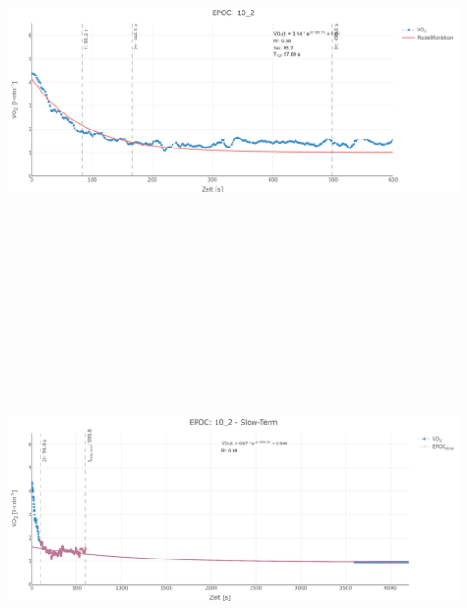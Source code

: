 \documentclass[
  letterpaper,
  DIV=11]{scrartcl}
\begin{document}
\includegraphics[width=11.45833in,height=4.6875in]{images/10_2_tau.png}
\includegraphics[width=11.45833in,height=4.6875in]{images/10_2_slow.png}
\end{document}
